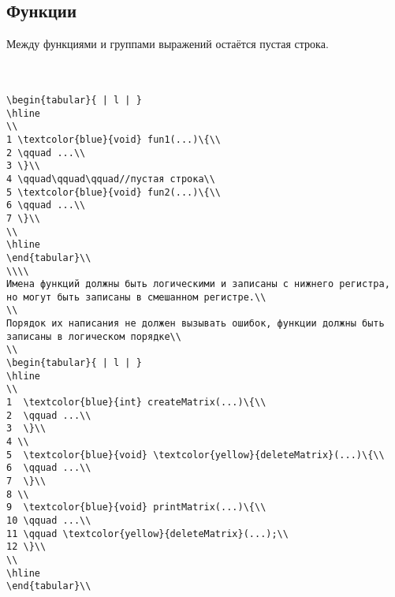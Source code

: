 \documentclass{article}
\begin{document}
\subsection{Функции}
Между функциями и группами выражений остаётся пустая строка.\\
\\\\
\begin{lstlisting}
\begin{tabular}{ | l | }
\hline
\\
1 \textcolor{blue}{void} fun1(...)\{\\
2 \qquad ...\\
3 \}\\
4 \qquad\qquad\qquad//пустая строка\\
5 \textcolor{blue}{void} fun2(...)\{\\
6 \qquad ...\\
7 \}\\
\\
\hline
\end{tabular}\\
\\\\
Имена функций должны быть логическими и записаны с нижнего регистра, но могут быть записаны в смешанном регистре.\\
\\
Порядок их написания не должен вызывать ошибок, функции должны быть записаны в логическом порядке\\
\\
\begin{tabular}{ | l | }
\hline
\\
1  \textcolor{blue}{int} createMatrix(...)\{\\
2  \qquad ...\\
3  \}\\
4 \\
5  \textcolor{blue}{void} \textcolor{yellow}{deleteMatrix}(...)\{\\
6  \qquad ...\\
7  \}\\
8 \\
9  \textcolor{blue}{void} printMatrix(...)\{\\
10 \qquad ...\\
11 \qquad \textcolor{yellow}{deleteMatrix}(...);\\
12 \}\\
\\
\hline
\end{tabular}\\
\end{lstlisting}
\end{document}
